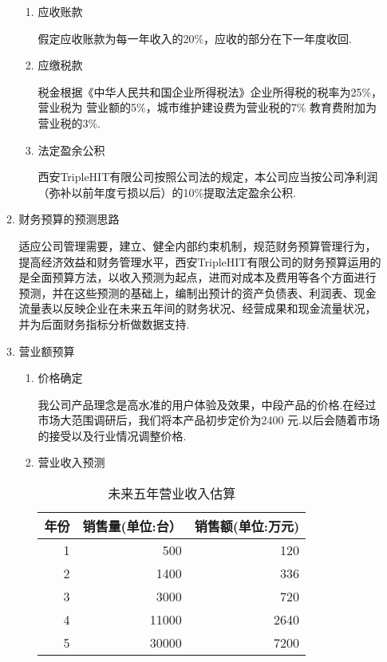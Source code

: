 \begin{enumerate}
\begin{enumerate}[(1)]
\begin{enumerate}[$\bullet$]
            \item 应收账款

                  假定应收账款为每一年收入的20\%，应收的部分在下一年度收回.

            \item 应缴税款

                  税金根据《中华人民共和国企业所得税法》企业所得税的税率为25\%，营业税为 营业额的5\%，城市维护建设费为营业税的7\% 教育费附加为营业税的3\%.

            \item 法定盈余公积

                  西安TripleHIT有限公司按照公司法的规定，本公司应当按公司净利润（弥补以前年度亏损以后）的10\%提取法定盈余公积.
            \end{enumerate}

      \item 财务预算的预测思路

            适应公司管理需要，建立、健全内部约束机制，规范财务预算管理行为，提高经济效益和财务管理水平，西安TripleHIT有限公司的财务预算运用的是全面预算方法，以收入预测为起点，进而对成本及费用等各个方面进行预测，并在这些预测的基础上，编制出预计的资产负债表、利润表、现金流量表以反映企业在未来五年间的财务状况、经营成果和现金流量状况，并为后面财务指标分析做数据支持.

      \item 营业额预算

            \begin{enumerate}[$\bullet$]
            \item 价格确定

                  我公司产品理念是高水准的用户体验及效果，中段产品的价格.在经过市场大范围调研后，我们将本产品初步定价为2400 元.以后会随着市场的接受以及行业情况调整价格.

            \item 营业收入预测

                  \begin{table}[H]
                  \centering
                  \caption{未来五年营业收入估算}
                  \begin{tabular}{|rrr|}
                  \toprule
                  年份 & 销售量(单位:台） & 销售额(单位:万元) \\
                  \hline
                  1     & 500   & 120 \\
                  2     & 1400  & 336 \\
                  3     & 3000  & 720 \\
                  4     & 11000 & 2640 \\
                  5     & 30000 & 7200 \\
                  \bottomrule
                  \end{tabular}%
                  \label{tab:addlabel}%
                  \end{table}%
            \end{enumerate}


\end{enumerate}
\end{enumerate}
